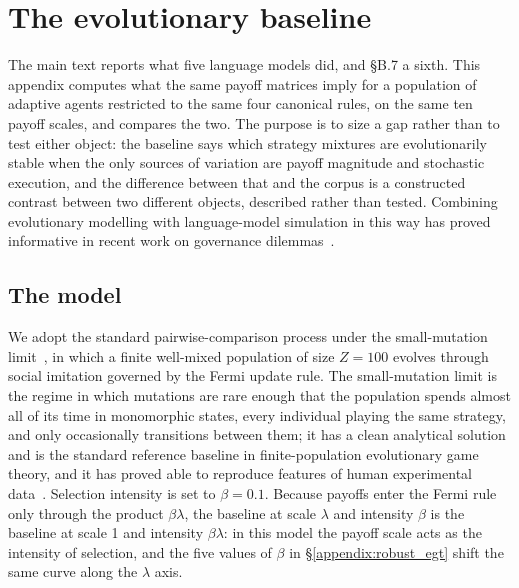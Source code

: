 \documentclass[11pt,a4paper]{article}
\newcommand{\lam}{\lambda}
\newcommand{\rev}[1]{{\color{red}#1}}
\newcommand{\rev}[1]{#1}
\begin{document}
\FloatBarrier


\section{The evolutionary baseline}\label{appendix:egt}

The main text reports what five language models did\rev{, and \S B.7 a sixth}. This appendix computes what the same payoff matrices imply for a population of adaptive agents restricted to the same four canonical rules, on the same ten payoff scales, and compares the two. The purpose is to size a gap rather than to test either object: the baseline says which strategy mixtures are evolutionarily stable when the only sources of variation are payoff magnitude and stochastic execution, and the difference between that and the corpus is \rev{a constructed contrast between two different objects, described rather than tested}. Combining evolutionary modelling with language-model simulation in this way has proved informative in recent work on governance dilemmas~\cite{balabanova2025media,buscemi2025llms}.

\subsection{The model}\label{appendix:egt_model}

We adopt the standard pairwise-comparison process under the small-mutation limit~\cite{sigmund:2010bo,han_when_2021,nowak2004emergence,liu2020evolutionary}, in which a finite well-mixed population of size $Z = 100$ evolves through social imitation governed by the Fermi update rule. The small-mutation limit is the regime in which mutations are rare enough that the population spends almost all of its time in monomorphic states, every individual playing the same strategy, and only occasionally transitions between them; it has a clean analytical solution and is the standard reference baseline in finite-population evolutionary game theory, and it has proved able to reproduce features of human experimental data~\cite{rand2013evolution,zisis2015generosity}. Selection intensity is set to $\beta = 0.1$.  \rev{Because payoffs enter the Fermi rule only through the product $\beta\lam$, the baseline at scale $\lam$ and intensity $\beta$ is the baseline at scale 1 and intensity $\beta\lam$: in this model the payoff scale acts as the intensity of selection, and the five values of $\beta$ in \S\ref{appendix:robust_egt} shift the same curve along the $\lam$ axis.}
\end{document}
